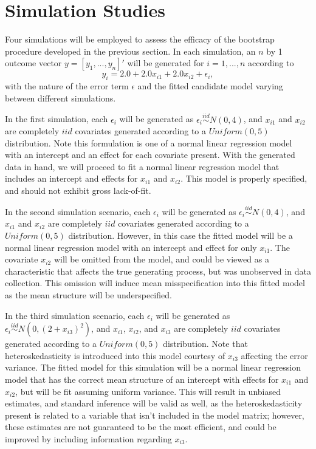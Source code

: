 \documentclass[12pt]{article} %
\theoremstyle{definition}
\begin{document}
\section{Simulation Studies}

Four simulations will be employed to assess the efficacy of the bootstrap procedure developed in the previous section. In each simulation, an $n$ by 1 outcome vector $y = [y_1,...,y_n]'$ will
be generated for $i = 1,...,n$ according to
\begin{equation*}
	y_i = 2.0 + 2.0 x_{i1} + 2.0 x_{i2} + \epsilon_i , 
\end{equation*}
with the nature of the error term $\epsilon$ and the fitted candidate model varying between different simulations.

In the first simulation, each $\epsilon_i$ will be generated as $\epsilon_i \stackrel{iid}{\sim} N(0,4)$, and $x_{i1}$ and $x_{i2}$ are completely $iid$ covariates generated according to
a $Uniform(0,5)$ distribution. Note this formulation is one of a normal linear regression model with an intercept and an effect for each covariate present. With the generated data in hand, we will
proceed to fit a normal linear regression model that includes an intercept and effects for $x_{i1}$ and $x_{i2}$. This model is properly specified, and should not exhibit gross lack-of-fit.

In the second simulation scenario, each $\epsilon_i$ will be generated as $\epsilon_i \stackrel{iid}{\sim} N(0,4)$, and $x_{i1}$ and $x_{i2}$ are completely $iid$ covariates generated according to
a $Uniform(0,5)$ distribution. However, in this case the fitted model will be a normal linear regression model with an intercept and effect for only
$x_{i1}$. The covariate $x_{i2}$ will be omitted from the model, and could be viewed as a characteristic that affects the true generating process, but
was unobserved in data collection. This omission will induce mean misspecification into this fitted model as the mean structure will be underspecified.

In the third simulation scenario, each $\epsilon_i$ will be generated as $\epsilon_i \stackrel{iid}{\sim} N \left( 0,(2 + x_{i3})^2 \right)$, and $x_{i1}$, $x_{i2}$, and $x_{i3}$ are completely $iid$ covariates
generated according to a $Uniform(0,5)$ distribution. Note that heteroskedasticity is introduced into this model courtesy of $x_{i3}$ affecting the error variance. The fitted model for
this simulation will be a normal linear regression model that has the correct mean structure of an intercept with effects for $x_{i1}$ and $x_{i2}$, but will be fit assuming uniform variance.
This will result in unbiased estimates, and standard inference will be valid as well, as the heteroskedasticity present is related to a variable that isn't included in the model matrix; however,
these estimates are not guaranteed to be the most efficient, and could be improved by including information regarding $x_{i3}$.
\end{document}
